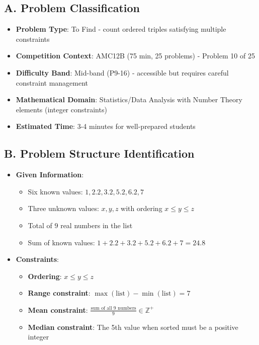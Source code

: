\documentclass[11pt]{article}
\begin{document}
\begin{problemconfigbox}
\subsection*{A. Problem Classification}
\begin{itemize}[leftmargin=*]
    \item \textbf{Problem Type}: To Find - count ordered triples satisfying multiple constraints
    \item \textbf{Competition Context}: AMC12B (75 min, 25 problems) - Problem 10 of 25
    \item \textbf{Difficulty Band}: Mid-band (P9-16) - accessible but requires careful constraint management
    \item \textbf{Mathematical Domain}: Statistics/Data Analysis with Number Theory elements (integer constraints)
    \item \textbf{Estimated Time}: 3-4 minutes for well-prepared students
\end{itemize}

\subsection*{B. Problem Structure Identification}
\begin{itemize}[leftmargin=*]
    \item \textbf{Given Information}: 
    \begin{itemize}
        \item Six known values: $1, 2.2, 3.2, 5.2, 6.2, 7$
        \item Three unknown values: $x, y, z$ with ordering $x \leq y \leq z$
        \item Total of $9$ real numbers in the list
        \item Sum of known values: $1 + 2.2 + 3.2 + 5.2 + 6.2 + 7 = 24.8$
    \end{itemize}
    
    \item \textbf{Constraints}: 
    \begin{itemize}
        \item \textbf{Ordering}: $x \leq y \leq z$
        \item \textbf{Range constraint}: $\max(\text{list}) - \min(\text{list}) = 7$
        \item \textbf{Mean constraint}: $\frac{\text{sum of all 9 numbers}}{9} \in \mathbb{Z}^+$
        \item \textbf{Median constraint}: The 5th value when sorted must be a positive integer
    \end{itemize}
    

\end{itemize}
\end{problemconfigbox}
\end{document}
